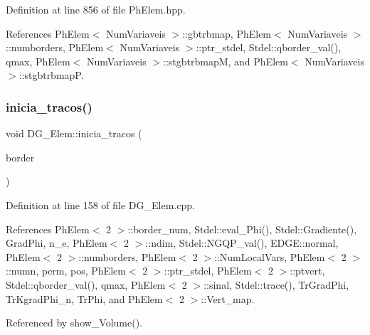Definition at line 856 of file Ph\+Elem.\+hpp.



References Ph\+Elem$<$ Num\+Variaveis $>$\+::gbtrbmap, Ph\+Elem$<$ Num\+Variaveis $>$\+::numborders, Ph\+Elem$<$ Num\+Variaveis $>$\+::ptr\+\_\+stdel, Stdel\+::qborder\+\_\+val(), qmax, Ph\+Elem$<$ Num\+Variaveis $>$\+::stgbtrbmapM, and Ph\+Elem$<$ Num\+Variaveis $>$\+::stgbtrbmapP.

\mbox{\label{classDG__Elem_a33d01f96cc0d00b6a1a1d4a817724b4c}} 
\subsubsection{\texorpdfstring{inicia\+\_\+tracos()}{inicia\_tracos()}}
{\footnotesize\ttfamily void D\+G\+\_\+\+Elem\+::inicia\+\_\+tracos (\begin{DoxyParamCaption}\item[{\hyperlink{structEDGE}{E\+D\+GE} $\ast$}]{border }\end{DoxyParamCaption})}



Definition at line 158 of file D\+G\+\_\+\+Elem.\+cpp.



References Ph\+Elem$<$ 2 $>$\+::border\+\_\+num, Stdel\+::eval\+\_\+\+Phi(), Stdel\+::\+Gradiente(), Grad\+Phi, n\+\_\+e, Ph\+Elem$<$ 2 $>$\+::ndim, Stdel\+::\+N\+G\+Q\+P\+\_\+val(), E\+D\+G\+E\+::normal, Ph\+Elem$<$ 2 $>$\+::numborders, Ph\+Elem$<$ 2 $>$\+::\+Num\+Local\+Vars, Ph\+Elem$<$ 2 $>$\+::numn, perm, pos, Ph\+Elem$<$ 2 $>$\+::ptr\+\_\+stdel, Ph\+Elem$<$ 2 $>$\+::ptvert, Stdel\+::qborder\+\_\+val(), qmax, Ph\+Elem$<$ 2 $>$\+::sinal, Stdel\+::trace(), Tr\+Grad\+Phi, Tr\+Kgrad\+Phi\+\_\+n, Tr\+Phi, and Ph\+Elem$<$ 2 $>$\+::\+Vert\+\_\+map.



Referenced by show\+\_\+\+Volume().

